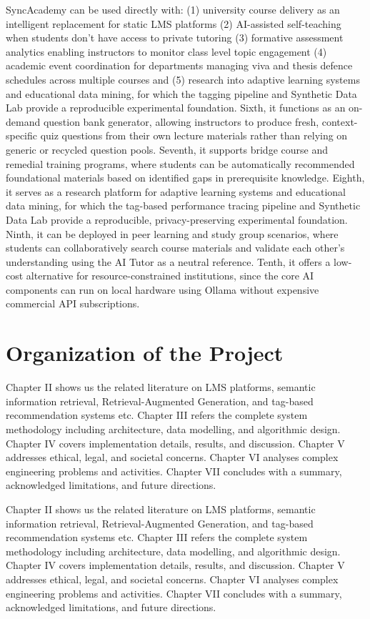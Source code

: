 \documentclass[12pt,a4paper]{report}
\begin{document}
SyncAcademy can be used directly with: (1) university course delivery as an intelligent replacement for static LMS platforms (2) AI-assisted self-teaching when students don't have access to private tutoring (3) formative assessment analytics enabling instructors to monitor class level topic engagement (4) academic event coordination for departments managing viva and thesis defence schedules across multiple courses and (5) research into adaptive learning systems and educational data mining, for which the tagging pipeline and Synthetic Data Lab provide a reproducible experimental foundation. Sixth, it functions as an on-demand question bank generator, allowing instructors to produce fresh, context-specific quiz questions from their own lecture materials rather than relying on generic or recycled question pools. Seventh, it supports bridge course and remedial training programs, where students can be automatically recommended foundational materials based on identified gaps in prerequisite knowledge. Eighth, it serves as a research platform for adaptive learning systems and educational data mining, for which the tag-based performance tracing pipeline and Synthetic Data Lab provide a reproducible, privacy-preserving experimental foundation. Ninth, it can be deployed in peer learning and study group scenarios, where students can collaboratively search course materials and validate each other's understanding using the AI Tutor as a neutral reference. Tenth, it offers a low-cost alternative for resource-constrained institutions, since the core AI components can run on local hardware using Ollama without expensive commercial API subscriptions.

\section{Organization of the Project}

Chapter II shows us the related literature on LMS platforms, semantic information retrieval, Retrieval-Augmented Generation, and tag-based recommendation systems etc. Chapter III refers the complete system methodology including architecture, data modelling, and algorithmic design. Chapter IV covers implementation details, results, and discussion. Chapter V addresses ethical, legal, and societal concerns. Chapter VI analyses complex engineering problems and activities. Chapter VII concludes with a summary, acknowledged limitations, and future directions.

Chapter II shows us the related literature on LMS platforms, semantic information retrieval,
Retrieval-Augmented Generation, and tag-based recommendation systems etc. Chapter III
refers the complete system methodology including architecture, data modelling, and
algorithmic design. Chapter IV covers implementation details, results, and discussion.
Chapter V addresses ethical, legal, and societal concerns. Chapter VI analyses complex
engineering problems and activities. Chapter VII concludes with a summary, acknowledged
limitations, and future directions.
\end{document}
